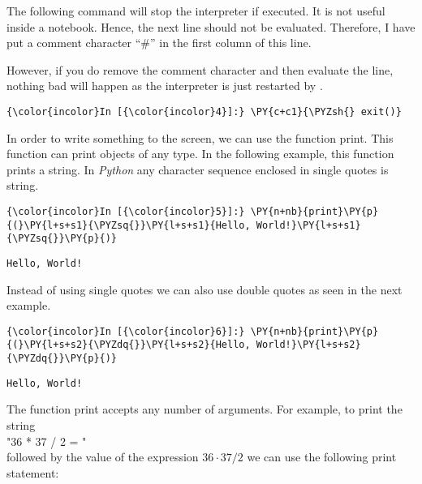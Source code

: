 The following command will stop the interpreter if executed. It is not
useful inside a  notebook. 
Hence, the next line should not be evaluated. Therefore, I have put a
comment character ``\#'' in the first column of this line.

However, if you do remove the comment character and then evaluate the
line, nothing bad will happen as the interpreter is just restarted by
.

\begin{Verbatim}[commandchars=\\\{\}]
{\color{incolor}In [{\color{incolor}4}]:} \PY{c+c1}{\PYZsh{} exit()}
\end{Verbatim}

In order to write something to the screen, we can use the function
print. This function can print objects of any type. In the following
example, this function prints a string. In \textsl{Python} any character
sequence enclosed in single quotes is string.

\begin{Verbatim}[commandchars=\\\{\}]
{\color{incolor}In [{\color{incolor}5}]:} \PY{n+nb}{print}\PY{p}{(}\PY{l+s+s1}{\PYZsq{}}\PY{l+s+s1}{Hello, World!}\PY{l+s+s1}{\PYZsq{}}\PY{p}{)}
\end{Verbatim}


\begin{Verbatim}[commandchars=\\\{\}]
Hello, World!
\end{Verbatim}

Instead of using single quotes we can also use double quotes as seen in
the next example.

\begin{Verbatim}[commandchars=\\\{\}]
{\color{incolor}In [{\color{incolor}6}]:} \PY{n+nb}{print}\PY{p}{(}\PY{l+s+s2}{\PYZdq{}}\PY{l+s+s2}{Hello, World!}\PY{l+s+s2}{\PYZdq{}}\PY{p}{)}
\end{Verbatim}


\begin{Verbatim}[commandchars=\\\{\}]
Hello, World!
\end{Verbatim}

The function print accepts any number of arguments. For example, to
print the string
\\[0.2cm]
\hspace*{1.3cm}
"36 * 37 / 2 = "
\\[0.2cm]
followed by the value of the expression \(36 \cdot 37 / 2\) we can use the following print statement:

